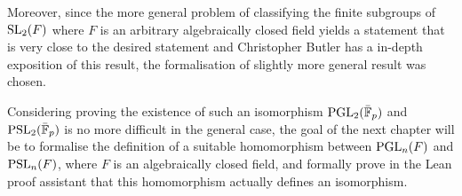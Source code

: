 Moreover, since the more general problem of classifying the finite subgroups of $\operatorname{SL}_2(F)$ where $F$ is an arbitrary algebraically closed field
yields a statement that is very close to the desired statement and Christopher Butler has a in-depth exposition of this result, the formalisation of slightly more general result was chosen.

Considering proving the existence of such an isomorphism $\operatorname{PGL}_2(\bar{\mathbb{F}}_p)$ and $\operatorname{PSL}_2(\bar{\mathbb{F}}_p)$ is no more difficult in the general case, 
the goal of the next chapter will be to formalise the definition of a suitable homomorphism between $\operatorname{PGL}_n(F)$ and $\operatorname{PSL}_n(F)$, where $F$ is an algebraically closed field, 
and formally prove in the Lean proof assistant that this homomorphism actually defines an isomorphism.